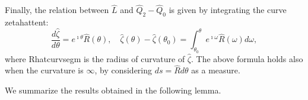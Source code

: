 \documentclass[reqno]{amsart}
\theoremstyle{definition} \newtheorem{definition}{Definition}[section]
\theoremstyle{definition} \newtheorem{remark}[definition]{Remark}
\theoremstyle{plain} \newtheorem{lemma}[definition]{Lemma}
\theoremstyle{plain} \newtheorem{proposition}[definition]{Proposition}
\theoremstyle{plain} \newtheorem{theorem}[definition]{Theorem}
\theoremstyle{plain} \newtheorem{corollary}[definition]{Corollary}
\theoremstyle{definition} \newtheorem{example}[definition]{Example}
\theoremstyle{plain} \newtheorem{claim}[clai]{Claim}
\theoremstyle{definition} \newtheorem{assumption}[definition]{Assumption}
\theoremstyle{definition} \newtheorem{observation}[definition]{Observation}
\newcommand{\1}{\mathbbm 1}
\renewcommand{\i}{\imath}
\numberwithin{equation}{section} %
\theoremstyle{plain} \newtheorem*{theorem*}{Theorem}
\theoremstyle{plain} \newtheorem{mthm}[maintheorem]{Main Theorem}
\theoremstyle{plain} \newtheorem*{mthm*}{Main Theorem}
\theoremstyle{plain} \newtheorem*{conjecture*}{Conjecture}
\theoremstyle{plain} \newtheorem{conjecture}[definition]{Conjecture}
\theoremstyle{plain} \newtheorem*{problem*}{Problem}
\begin{document}
Finally, the relation between $\hat L$ and $\hat Q_2 - \hat Q_0$ is given by integrating the curve  \gls{zetahattent}: 
\begin{equation*}
\frac{d\hat \zeta}{d\theta} = e^{\i \theta} \hat R(\theta), \quad \hat \zeta(\theta) - \hat \zeta(\theta_0) = \int_{\theta_0}^{\theta} e^{\i \omega} \hat R(\omega) d\omega,
\end{equation*}
where  \gls{Rhatcurvsegm} is the radius of curvature of $\hat \zeta$. The above formula holds also when the curvature is $\infty$, by considering $ds = \hat R d\theta$ as a measure.

We summarize the results obtained in the following lemma.
\end{document}
